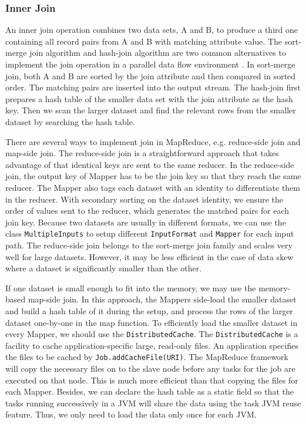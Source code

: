 \documentclass[11pt]{book}
\begin{document}
\subsubsection{Inner Join}

An inner join operation combines two data sets, A and B, to produce a third one containing all record pairs from A and B with matching attribute value. The sort-merge join algorithm and hash-join algorithm are two common alternatives to implement the join operation in a parallel data flow environment \cite{DeWitt:1992:PDS}. In sort-merge join, both A and B are sorted by the join attribute and then compared in sorted order. The matching pairs are inserted into the output stream. The hash-join first prepares a hash table of the smaller data set with the join attribute as the hash key. Then we scan the larger dataset and find the relevant rows from the smaller dataset by searching the hash table.

There are several ways to implement join in MapReduce, e.g. reduce-side join and map-side join. The reduce-side join is a straightforward approach that takes advantage of that identical keys are sent to the same reducer. In the reduce-side join, the output key of Mapper has to be the join key so that they reach the same reducer. The Mapper also tags each dataset with an identity to differentiate them in the reducer. With secondary sorting on the dataset identity, we ensure the order of values sent to the reducer, which generates the matched pairs for each join key.
Because two datasets are usually in different formats, we can use the class \texttt{MultipleInputs} to setup different \texttt{InputFormat} and \texttt{Mapper} for each input path. The reduce-side join belongs to the sort-merge join family and scales very well for large datasets. However, it may be less efficient in the case of data skew where a dataset is significantly smaller than the other.

If one dataset is small enough to fit into the memory, we may use the memory-based map-side join. In this approach, the Mappers side-load the smaller dataset and build a hash table of it during the setup, and process the rows of the larger dataset one-by-one in the map function. To efficiently load the smaller dataset in every Mapper, we should use the \texttt{DistributedCache}. The \texttt{DistributedCache} is a facility to cache application-specific large, read-only files. 
An application specifies the files to be cached by \texttt{Job.addCacheFile(URI)}. The MapReduce framework will copy the necessary files on to the slave node before any tasks for the job are executed on that node. This is much more efficient than that copying the files for each Mapper. Besides, we can declare the hash table as a static field so that the
tasks running successively in a JVM will share the data using the task JVM reuse feature. Thus, we only need to load the data only once for each JVM.
\end{document}
